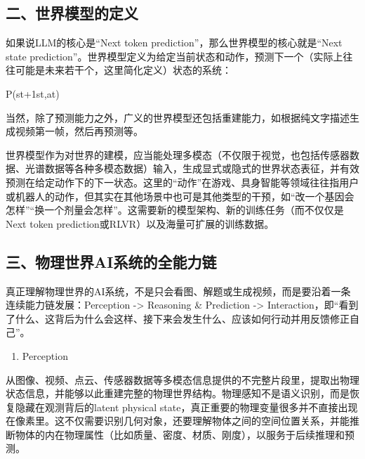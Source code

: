 \hypertarget{ux4e8cux4e16ux754cux6a21ux578bux7684ux5b9aux4e49}{%
\subsection{二、世界模型的定义}\label{ux4e8cux4e16ux754cux6a21ux578bux7684ux5b9aux4e49}}

如果说LLM的核心是``Next token prediction''，那么世界模型的核心就是``Next state prediction''。世界模型定义为给定当前状态和动作，预测下一个（实际上往往可能是未来若干个，这里简化定义）状态的系统：

P(st+1\textbar st,at)

当然，除了预测能力之外，广义的世界模型还包括重建能力，如根据纯文字描述生成视频第一帧，然后再预测等。

世界模型作为对世界的建模，应当能处理多模态（不仅限于视觉，也包括传感器数据、光谱数据等各种多模态数据）输入，生成显式或隐式的世界状态表征，并有效预测在给定动作下的下一状态。这里的``动作''在游戏、具身智能等领域往往指用户或机器人的动作，但其实在其他场景中也可是其他类型的干预，如``改一个基因会怎样''``换一个剂量会怎样''。这需要新的模型架构、新的训练任务（而不仅仅是Next token prediction或RLVR）以及海量可扩展的训练数据。

\hypertarget{ux4e09ux7269ux7406ux4e16ux754caiux7cfbux7edfux7684ux5168ux80fdux529bux94fe}{%
\subsection{三、物理世界AI系统的全能力链}\label{ux4e09ux7269ux7406ux4e16ux754caiux7cfbux7edfux7684ux5168ux80fdux529bux94fe}}

真正理解物理世界的AI系统，不是只会看图、解题或生成视频，而是要沿着一条连续能力链发展：Perception -\textgreater{} Reasoning \& Prediction -\textgreater{} Interaction，即``看到了什么、这背后为什么会这样、接下来会发生什么、应该如何行动并用反馈修正自己''。

\begin{enumerate}
\def\labelenumi{\arabic{enumi}.}
\tightlist
\item
  Perception
\end{enumerate}

从图像、视频、点云、传感器数据等多模态信息提供的不完整片段里，提取出物理状态信息，并能够以此重建完整的物理世界结构。物理感知不是语义识别，而是恢复隐藏在观测背后的latent physical state，真正重要的物理变量很多并不直接出现在像素里。这不仅需要识别几何对象，还要理解物体之间的空间位置关系，并能推断物体的内在物理属性（比如质量、密度、材质、刚度），以服务于后续推理和预测。

